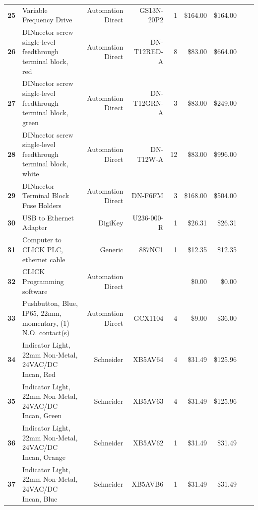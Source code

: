 \begin{table}[!htp]
{\begin{tabular}{llrrrrrrr}
			\textbf{25}    & Variable Frequency Drive                                                         & Automation Direct & GS13N-20P2        & 1  & \$164.00   & \$164.00   \\
			\textbf{26}    & DINnector screw single-level feedthrough terminal block, red                     & Automation Direct & DN-T12RED-A       & 8  & \$83.00    & \$664.00   \\
			\textbf{27}    & DINnector screw single-level feedthrough terminal block, green                   & Automation Direct & DN-T12GRN-A       & 3  & \$83.00    & \$249.00   \\
			\textbf{28}    & DINnector screw single-level feedthrough terminal block, white                   & Automation Direct & DN-T12W-A         & 12 & \$83.00    & \$996.00   \\
			\textbf{29}    & DINnector Terminal Block Fuse Holders                                            & Automation Direct & DN-F6FM           & 3  & \$168.00   & \$504.00   \\
			\textbf{30}    & USB to Ethernet Adapter                                                          & DigiKey           & U236-000-R        & 1  & \$26.31    & \$26.31    \\
			\textbf{31}    & Computer to CLICK PLC, ethernet cable                                            & Generic           & 887NC1            & 1  & \$12.35    & \$12.35    \\
			\textbf{32}    & CLICK Programming software                                                       & Automation Direct &                   &    & \$0.00     & \$0.00     \\
			\textbf{33}    & Pushbutton, Blue, IP65, 22mm, momentary, (1) N.O. contact(s)                     & Automation Direct & GCX1104           & 4  & \$9.00     & \$36.00    \\
			\textbf{34}    & Indicator Light, 22mm Non-Metal, 24VAC/DC Incan, Red                             & Schneider         & XB5AV64           & 4  & \$31.49    & \$125.96   \\
			\textbf{35}    & Indicator Light, 22mm Non-Metal, 24VAC/DC Incan, Green                           & Schneider         & XB5AV63           & 4  & \$31.49    & \$125.96   \\
			\textbf{36}    & Indicator Light, 22mm Non-Metal, 24VAC/DC Incan, Orange                          & Schneider         & XB5AV62           & 1  & \$31.49    & \$31.49    \\
			\textbf{37}    & Indicator Light, 22mm Non-Metal, 24VAC/DC Incan, Blue                            & Schneider         & XB5AVB6           & 1  & \$31.49    & \$31.49    \\

\end{tabular}}
\end{table}
